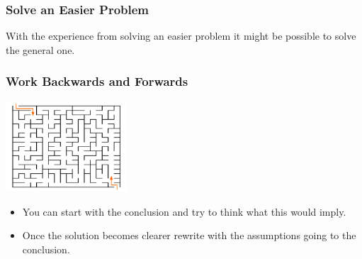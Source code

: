 \documentclass{beamer}
\begin{document}
\fi

\begin{frame}%
\frametitle{Solve an Easier Problem}

With the experience from solving an easier problem it might be possible to solve the general one.\\




\end{frame}


\begin{frame}%
\frametitle{Work Backwards and Forwards}

\begin{center}
\includegraphics[width=4.5cm]{maze.pdf}
\end{center}

\begin{itemize}

\item You can start with the conclusion and try to think what this would imply.

\vspace{0.15cm}

\item<2-> Once the solution becomes clearer rewrite with the assumptions going to the conclusion.

\end{itemize}





\end{frame}
\end{document}
